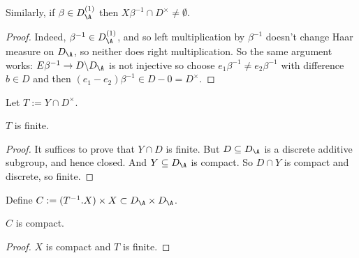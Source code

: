 \begin{lemma}
  \label{NumberField.AdeleRing.DivisionAlgebra.Aux.X_meets_kernel'}
  \leanok
  Similarly, if $\beta\in D_{\A}^{(1)}$ then $X\beta^{-1}\cap D^\times\not=\emptyset$.
\end{lemma}
\begin{proof}
  \leanok
  Indeed, $\beta^{-1}\in D_{\A}^{(1)}$, and so left multiplication by $\beta^{-1}$
  doesn't change Haar measure on $D_{\A}$, so neither does right multiplication.
  So the same argument works: $E\beta^{-1}\to D\backslash D_{\A}$ is not
  injective so choose $e_1\beta^{-1}\not=e_2\beta^{-1}$ with difference $b\in D$
  and then $(e_1-e_2)\beta^{-1}\in D-{0}=D^\times$.
\end{proof}

\begin{definition}
  \label{NumberField.AdeleRing.DivisionAlgebra.Aux.T}
  \leanok
  Let $T:=Y\cap D^\times$.
\end{definition}

\begin{lemma}
  \label{NumberField.AdeleRing.DivisionAlgebra.Aux.T_finite}
  \leanok
  $T$ is finite.
\end{lemma}
\begin{proof}
  \leanok
  It suffices to prove that $Y\cap D$ is finite. But $D\subseteq D_{\A}$ is a discrete additive
  subgroup, and hence closed. And $Y\subseteq D_{\A}$ is compact. So $D\cap Y$ is compact and
  discrete, so finite.
\end{proof}

\begin{definition}
  \label{NumberField.AdeleRing.DivisionAlgebra.Aux.C}
  \leanok
  Define $C:= (T^{-1}.X) \times X\subset D_{\A}\times D_{\A}$.
\end{definition}

\begin{lemma}
  \label{NumberField.AdeleRing.DivisionAlgebra.Aux.C_compact}
  \leanok
  $C$ is compact.
\end{lemma}
\begin{proof}
  \leanok
   $X$ is compact and $T$ is finite.
\end{proof}

